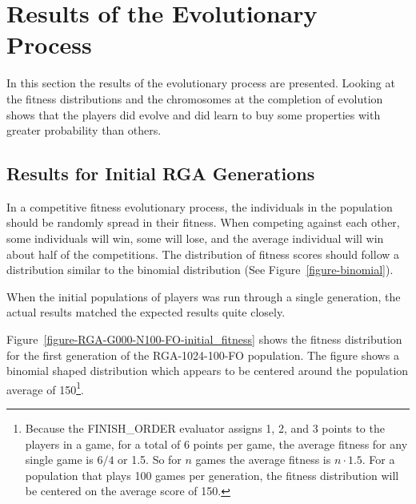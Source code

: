 \section{Results of the Evolutionary Process}\label{6_evoresults}

In this section the results of the evolutionary process are presented. Looking at
the fitness distributions and the chromosomes at the completion of evolution
shows that the players did evolve and did learn to buy some properties with greater
probability than others.

\subsection{Results for Initial RGA Generations}

In a competitive fitness evolutionary process, the individuals in the population
should be randomly spread in their fitness. When competing against each other,
some individuals will win, some will lose, and the average individual will win
about half of the competitions. The distribution of fitness scores should follow
a distribution similar to the binomial distribution (See
Figure~\ref{figure-binomial}).

When the initial populations of players was run through a single generation, the
actual results matched the expected results quite closely.

Figure~\ref{figure-RGA-G000-N100-FO-initial_fitness} shows the fitness
distribution for the first generation of the RGA-1024-100-FO population. The
figure shows a binomial shaped distribution which appears to be centered around
the population average of 150\footnote{Because the FINISH\_ORDER evaluator
assigns 1, 2, and 3 points to the players in a game, for a total of 6 points per
game, the average fitness for any single game is \(6/4\) or 1.5. So for \(n\)
games the average fitness is \(n \cdot 1.5\). For a population that plays 100
games per generation, the fitness distribution will be centered on the average
score of 150.}.

